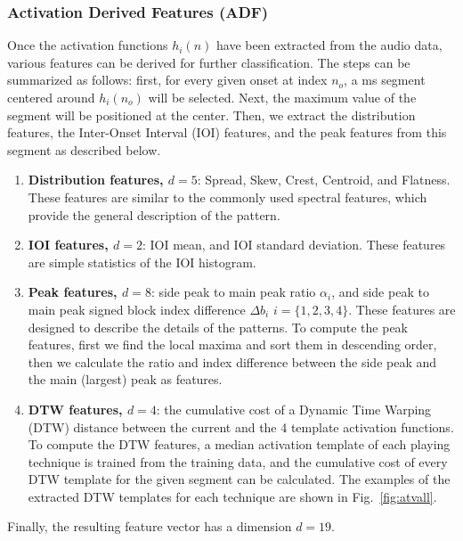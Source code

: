 \documentclass{article}
\begin{document}
\subsubsection{Activation Derived Features (ADF)}
\label{sssec:activ features}
Once the activation functions $h_{i}(n)$ have been extracted from the audio data, various features can be derived for further classification. The steps can be summarized as follows: first, for every given onset at index $n_{o}$, a \unit[400]{ms} segment centered around $h_{i}(n_{o})$ will be selected. Next, the maximum value of the segment will be positioned at the center. Then, we extract the distribution features, the Inter-Onset Interval (IOI) features, and the peak features from this segment as described below. 

\begin{enumerate}
	\item \textbf{Distribution features, $d = 5$}: Spread, Skew, Crest, Centroid, and Flatness. These features are similar to the commonly used spectral features, which provide the general description of the pattern. 
	\item \textbf{IOI features, $d = 2$}: IOI mean, and IOI standard deviation. These features are simple statistics of the IOI histogram.
	\item \textbf{Peak features, $d = 8$}: side peak to main peak ratio $\alpha_{i}$, and side peak to main peak signed block index difference $\Delta b_{i}$ $i = \{1, 2, 3, 4\}$. These features are designed to describe the details of the patterns. To compute the peak features, first we find the local maxima and sort them in descending order, then we calculate the ratio and index difference between the side peak and the main (largest) peak as features.
	\item \textbf{DTW features, $d = 4$}: the cumulative cost of a Dynamic Time Warping (DTW) distance between the current and the 4 template activation functions. To compute the DTW features, a median activation template of each playing technique is trained from the training data, and the cumulative cost of every DTW template for the given segment can be calculated. The examples of the extracted DTW templates for each technique are shown in Fig.~\ref{fig:atvall}.\\
\end{enumerate}

Finally, the resulting feature vector has a dimension $d = 19$.
\end{document}
